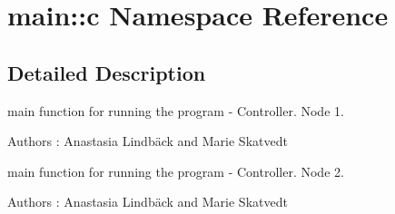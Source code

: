 \hypertarget{namespacemain_1_1c}{}\section{main\+:\+:c Namespace Reference}
\label{namespacemain_1_1c}


\subsection{Detailed Description}
main function for running the program -\/ Controller. Node 1.

\begin{DoxyAuthor}{Authors}
\+: Anastasia Lindbäck and Marie Skatvedt
\end{DoxyAuthor}
main function for running the program -\/ Controller. Node 2.

\begin{DoxyAuthor}{Authors}
\+: Anastasia Lindbäck and Marie Skatvedt 
\end{DoxyAuthor}

